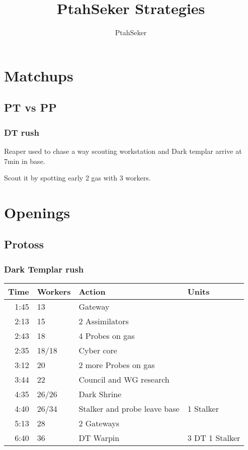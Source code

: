 \documentclass{report}
\title{PtahSeker Strategies}
\date{}
\author{PtahSeker}
\newcommand{\action}[4]{#1 & #2 & #3 & #4 \\ \hline}
\newenvironment{opening}
{
    \begin{tabular}{|r|l|l|l|}
    \hline
    \textbf{Time} & \textbf{Workers} & \textbf{Action} & \textbf{Units} \\
    \hline
}
{
    \end{tabular}
}
\begin{document}
\maketitle
\tableofcontents\newpage
\chapter{Matchups}
\section{PT vs PP}
\subsection{DT rush}
Reaper used to chase a way scouting workstation and Dark
templar arrive at 7min in base.

Scout it by spotting early 2 gas with 3 workers.


\chapter{Openings}
\section{Protoss}
\subsection{Dark Templar rush}

\begin{opening}
\action{1:45}{13}   {Gateway}                     {}
\action{2:13}{15}   {2 Assimilators}              {}
\action{2:43}{18}   {4 Probes on gas}             {}
\action{2:35}{18/18}{Cyber core}                  {}
\action{3:12}{20}   {2 more Probes on gas}        {}
\action{3:44}{22}   {Council and WG research}     {}
\action{4:35}{26/26}{Dark Shrine}                 {}
\action{4:40}{26/34}{Stalker and probe leave base}{1 Stalker}
\action{5:13}{28}   {2 Gateways}                  {}
\action{6:40}{36}   {DT Warpin}                   {3 DT 1 Stalker}
\end{opening}
\end{document}
